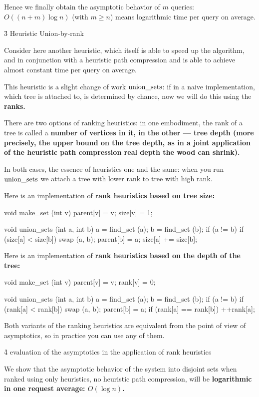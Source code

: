 Hence we finally obtain the asymptotic behavior of $m$ queries: $O((n+m) \log n)$ (with $m \ge n$) means logarithmic time per query on average.



\h3{ Heuristic Union-by-rank }

Consider here another heuristic, which itself is able to speed up the algorithm, and in conjunction with a heuristic path compression and is able to achieve almost constant time per query on average.

This heuristic is a slight change of work ${\rm union\_sets}$: if in a naive implementation, which tree is attached to, is determined by chance, now we will do this using the \bf{ranks}.

There are two options of ranking heuristics: in one embodiment, the rank of a tree is called a \bf{number of vertices} in it, in the other --- \bf{tree depth} (more precisely, the upper bound on the tree depth, as in a joint application of the heuristic path compression real depth the wood can shrink).

In both cases, the essence of heuristics one and the same: when you run $\rm union\_sets$ we attach a tree with lower rank to tree with high rank.

Here is an implementation of \bf{rank heuristics based on tree size}:

\code
void make_set (int v) {
parent[v] = v;
size[v] = 1;
}

void union_sets (int a, int b) {
a = find_set (a);
b = find_set (b);
if (a != b) {
if (size[a] < size[b])
swap (a, b);
parent[b] = a;
size[a] += size[b];
}
}
\endcode

Here is an implementation of \bf{rank heuristics based on the depth of the tree}:

\code
void make_set (int v) {
parent[v] = v;
rank[v] = 0;
}

void union_sets (int a, int b) {
a = find_set (a);
b = find_set (b);
if (a != b) {
if (rank[a] < rank[b])
swap (a, b);
parent[b] = a;
if (rank[a] == rank[b])
++rank[a];
}
}
\endcode

Both variants of the ranking heuristics are equivalent from the point of view of asymptotics, so in practice you can use any of them.


\h4{ evaluation of the asymptotics in the application of rank heuristics }

We show that the asymptotic behavior of the system into disjoint sets when ranked using only heuristics, no heuristic path compression, will be \bf{logarithmic} in one request average: $O (\log n)$.

